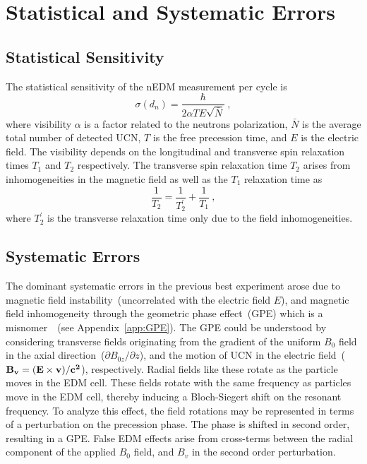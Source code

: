 \section{Statistical and Systematic Errors}
\subsection{Statistical Sensitivity}
The statistical sensitivity of the nEDM measurement per cycle is
\begin{equation}
  \label{eqn:dnsensitivity}
\sigma(d_n) = \frac{\hbar}{2 \alpha T E \sqrt{\bar{N}}}~,
\end{equation}
where visibility $\alpha$ is a factor related to the neutrons
polarization, $\bar{N}$ is the average total number of detected UCN,
$T$ is the free precession time, and $E$ is the electric field. The
visibility depends on the longitudinal and transverse spin relaxation
times $T_1$ and $T_2$ respectively. The transverse spin relaxation
time $T_2$ arises from inhomogeneities in the magnetic field as well
as the $T_1$ relaxation time as
\begin{equation}
\frac{1}{T_2} = \frac{1}{T_2^{\prime}}+\frac{1}{T_1}~,
\end{equation}
where $T_2^{\prime}$ is the transverse relaxation time only due to the
field inhomogeneities.

\subsection{Systematic Errors}
The dominant systematic errors in the previous best experiment arose
due to magnetic field instability~(uncorrelated with the electric
field $E$), and magnetic field inhomogeneity through the geometric
phase effect~(GPE) which is a misnomer~\cite{pendlebury2004}~(see
Appendix~\ref{app:GPE}).
The GPE could be understood by considering transverse fields
originating from the gradient of the uniform $B_0$ field in the axial
direction~($\partial{B_{0z}}/\partial{z}$), and the motion of UCN in
the electric field~($\bf{B_v} =(\bf{E} \times \bf{v})/c^2 $),
respectively. Radial fields like these rotate as the particle moves in
the EDM cell.  These fields rotate with the same frequency as
particles move in the EDM cell, thereby inducing a Bloch-Siegert shift
on the resonant frequency. To analyze this effect, the field rotations
may be represented in terms of a perturbation on the precession
phase. The phase is shifted in second order, resulting in a GPE. False
EDM effects arise from cross-terms between the radial component of the
applied $B_0$ field, and $B_v$ in the second order perturbation.

